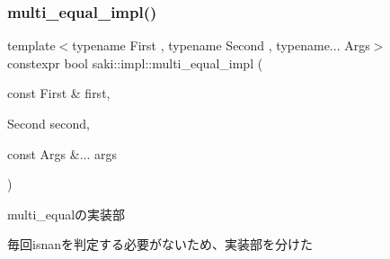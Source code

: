\subsubsection{\texorpdfstring{multi\+\_\+equal\+\_\+impl()}{multi\_equal\_impl()}\hspace{0.1cm}{\footnotesize\ttfamily [2/2]}}
{\footnotesize\ttfamily template$<$typename First , typename Second , typename... Args$>$ \\
constexpr bool saki\+::impl\+::multi\+\_\+equal\+\_\+impl (\begin{DoxyParamCaption}\item[{const First \&}]{first,  }\item[{Second}]{second,  }\item[{const Args \&...}]{args }\end{DoxyParamCaption})}



multi\+\_\+equalの実装部 

毎回isnanを判定する必要がないため、実装部を分けた 